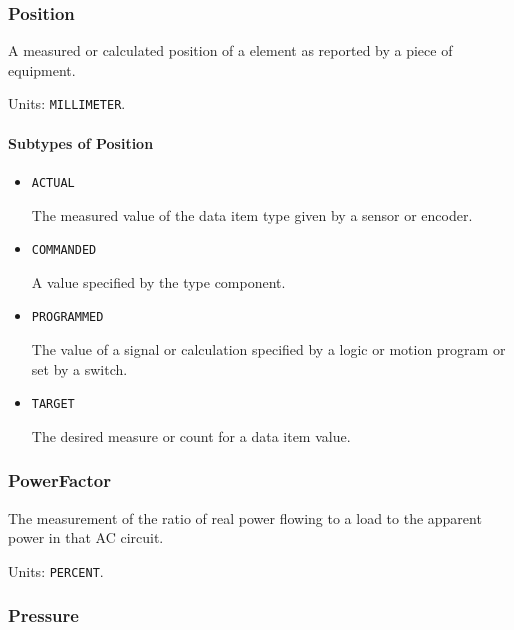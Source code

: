 \subsubsection{Position}
\label{sec:Position}



A measured or calculated position of a  element as reported by a piece of equipment.


Units: \texttt{MILLIMETER}.

\paragraph{Subtypes of Position}\mbox{}
\label{sec:Subtypes of Position}

\begin{itemize}

\item \texttt{ACTUAL}


The measured value of the data item type given by a sensor or encoder.

\item \texttt{COMMANDED}


A value specified by the  type component.

\item \texttt{PROGRAMMED}


The value of a signal or calculation specified by a logic or motion program or set by a switch.

\item \texttt{TARGET}


The desired measure or count for a data item value.


\end{itemize}

\subsubsection{PowerFactor}
\label{sec:PowerFactor}



The measurement of the ratio of real power flowing to a load to the apparent power in that AC circuit.


Units: \texttt{PERCENT}.

\subsubsection{Pressure}




